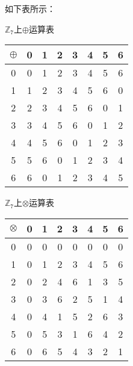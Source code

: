 \begin{Solution}
    如下表所示：

    \begin{minipage}[t]{0.45\linewidth}
            \centering
            \makeatletter{}\makeatother\caption{$\mathbb{Z}_7$上$\oplus$运算表}
            \begin{tabular}{|c|c|c|c|c|c|c|c|}
            \hline
            $\oplus$ & 0 & 1 & 2 & 3 & 4 & 5 & 6 \\ \hline
            0        & 0 & 1 & 2 & 3 & 4 & 5 & 6 \\ \hline
            1        & 1 & 2 & 3 & 4 & 5 & 6 & 0 \\ \hline
            2        & 2 & 3 & 4 & 5 & 6 & 0 & 1 \\ \hline
            3        & 3 & 4 & 5 & 6 & 0 & 1 & 2 \\ \hline
            4        & 4 & 5 & 6 & 0 & 1 & 2 & 3 \\ \hline
            5        & 5 & 6 & 0 & 1 & 2 & 3 & 4 \\ \hline
            6        & 6 & 0 & 1 & 2 & 3 & 4 & 5 \\ \hline
            \end{tabular}
    \end{minipage}%
    \begin{minipage}[t]{0.45\linewidth}
            \centering
            \makeatletter{}\makeatother\caption{$\mathbb{Z}_7$上$\otimes$运算表}
            \begin{tabular}{|c|c|c|c|c|c|c|c|}
            \hline
            $\otimes$ & 0 & 1 & 2 & 3 & 4 & 5 & 6 \\ \hline
            0        & 0 & 0 & 0 & 0 & 0 & 0 & 0 \\ \hline
            1        & 0 & 1 & 2 & 3 & 4 & 5 & 6 \\ \hline
            2        & 0 & 2 & 4 & 6 & 1 & 3 & 5 \\ \hline
            3        & 0 & 3 & 6 & 2 & 5 & 1 & 4 \\ \hline
            4        & 0 & 4 & 1 & 5 & 2 & 6 & 3 \\ \hline
            5        & 0 & 5 & 3 & 1 & 6 & 4 & 2 \\ \hline
            6        & 0 & 6 & 5 & 4 & 3 & 2 & 1 \\ \hline
            \end{tabular}
    \end{minipage}
    \\
\end{Solution}


